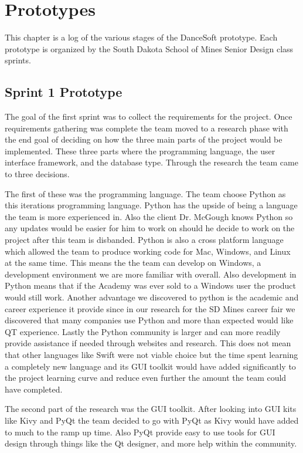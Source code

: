 
\chapter{Prototypes}

This chapter is a log of the various stages of the DanceSoft prototype. Each prototype is organized by the South Dakota School of Mines Senior Design class sprints.   

\section{Sprint 1 Prototype}

The goal of the first sprint was to collect the requirements for the project. Once requirements gathering was complete the team moved to a research phase with the end goal of deciding on how the three main parts of the project would be implemented. These three parts where the programming language, the user interface framework, and the database type. Through the research the team came to three decisions.

The first of these was the programming language. The team choose Python as this iterations programming language. Python has the upside of being a language the team is more experienced in. Also the client Dr. McGough knows Python so any updates would be easier for him to work on should he decide to work on the project after this team is disbanded. Python is also a cross platform language which allowed the team to produce working code for Mac, Windows, and Linux at the same time. This means the the team can develop on Windows, a development environment we are more familiar with overall. Also development in Python means that if the Academy was ever sold to a Windows user the product would still work. Another advantage we discovered to python is the academic and career experience it provide since in our research for the SD Mines career fair we discovered that many companies use Python and more than expected would like QT experience. Lastly the Python community is larger and can more readily provide assistance if needed through websites and research. This does not mean that other languages like Swift were not viable choice but the time spent learning a completely new language and its GUI toolkit would have added significantly to the project learning curve and reduce even further the amount the team could have completed.

The second part of the research was the GUI toolkit. After looking into GUI kits like Kivy and PyQt the team decided to go with PyQt as Kivy would have added to much to the ramp up time. Also PyQt provide easy to use tools for GUI design through things like the Qt designer, and more help within the community.

